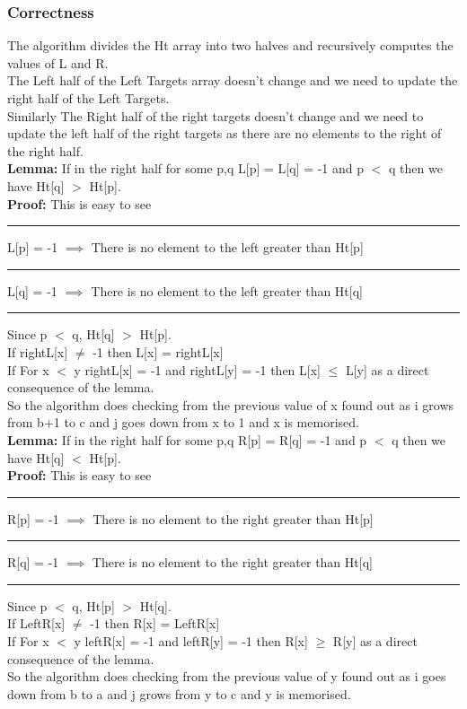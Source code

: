 \documentclass{report}
\begin{document}
 \subsubsection*{Correctness}
 The algorithm divides the Ht array into two halves and recursively computes the values of L and R.\\
 The Left half of the Left Targets array doesn't change and we need to update the right half of the Left Targets.\\
 Similarly The Right half of the right targets doesn't change and we need to update the left half of the right targets as there are no elements to the right of the right half.\\
 \textbf{Lemma:} If in the right half for some p,q L[p] = L[q] = -1 and p $<$ q then we have Ht[q] $>$ Ht[p].\\
 \textbf{Proof:} This is easy to see\\
 \rule[0.5mm]{1cm}{0pt} L[p] = -1 $\implies$ There is no element to the left greater than Ht[p]\\
 \rule[0.5mm]{1cm}{0pt} L[q] = -1 $\implies$ There is no element to the left greater than Ht[q]\\
 \rule[0.5mm]{1cm}{0pt} Since p $<$ q, Ht[q] $>$ Ht[p].\\
 If rightL[x] $\neq$ -1 then L[x] = rightL[x]\\
 If For x $<$ y rightL[x] = -1 and rightL[y] = -1  then L[x] $\leq$ L[y] as a direct consequence of the lemma.\\
 So the algorithm does checking from the previous value of x found out as i grows from b+1 to c and j goes down from x to 1 and x is memorised.\\
 \textbf{Lemma:} If in the right half for some p,q R[p] = R[q] = -1 and p $<$ q then we have Ht[q] $<$ Ht[p].\\
 \textbf{Proof:} This is easy to see\\
 \rule[0.5mm]{1cm}{0pt} R[p] = -1 $\implies$ There is no element to the right greater than Ht[p]\\
 \rule[0.5mm]{1cm}{0pt} R[q] = -1 $\implies$ There is no element to the right greater than Ht[q]\\
 \rule[0.5mm]{1cm}{0pt} Since p $<$ q, Ht[p] $>$ Ht[q].\\
 If LeftR[x] $\neq$ -1 then R[x] = LeftR[x]\\
 If For x $<$ y leftR[x] = -1 and leftR[y] = -1  then R[x] $\geq$ R[y] as a direct consequence of the lemma.\\
 So the algorithm does checking from the previous value of y found out as i goes down from b to a and j grows from y to c and y is memorised.\\
\end{document}
